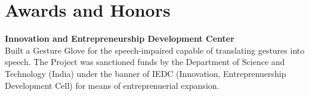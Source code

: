 \documentclass{resume}
\begin{document}
\section*{Awards and Honors}
\noindent
\textbf{Innovation and Entrepreneurship Development Center} \\
Built a Gesture Glove for the speech-impaired capable of translating gestures into speech. The Project was sanctioned funds by the Department of Science and Technology (India) under the banner of IEDC (Innovation, Entreprenuership Development Cell) for means of entreprenuerial expansion. \\
\end{document}
